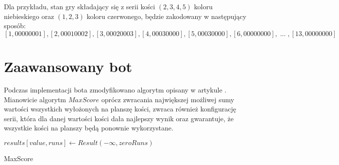 Dla przykładu, stan gry składający się z serii kości $(2, 3, 4, 5)$ koloru niebieskiego oraz $(1, 2, 3)$ koloru czerwonego, będzie zakodowany w następujący sposób: $$[1, 00000001], [2, 00010002], [3, 00020003], [4, 00030000], [5, 00030000], [6, 00000000], \;  ... \;, [13, 00000000]$$

\section{Zaawansowany bot}

Podczas implementacji bota zmodyfikowano algorytm opisany w artykule \cite{RummikubComplexity}. Mianowicie algorytm $MaxScore$ oprócz zwracania największej możliwej sumy wartości wszystkich wyłożonych na planszę kości, zwraca również konfigurację serii, która dla danej wartości kości dała najlepszy wynik oraz gwarantuje, że wszystkie kości na planszy będą ponownie wykorzystane. \\

\begin{pseudokod}[H]
	\vskip 1mm

	$results[value, runs] \leftarrow Result(-\infty, zeroRuns)$\;
	\caption{MaxScore}\label{alg:mine}
\end{pseudokod}
\vskip 3mm

